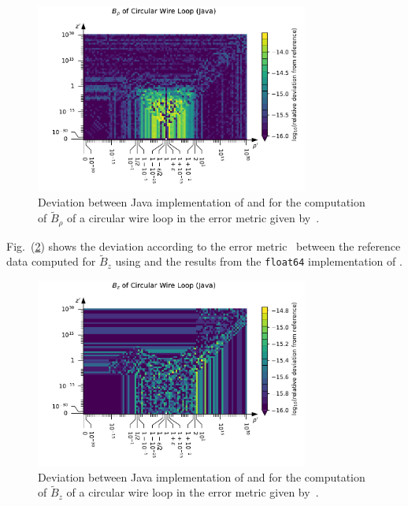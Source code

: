 \begin{figure}[htbp]
 \centering
 \includegraphics[width=0.8\textwidth]{img/CircularWireLoop_B_rho_Java.pdf}
 \caption{Deviation between Java implementation of  and 
          for the computation of $\tilde{B}_\rho$ of a circular wire loop
          in the error metric given by~.}
 \label{fig:CircularWireLoop_B_rho_Java}
\end{figure}
Fig.~(\ref{fig:CircularWireLoop_B_z_Java}) shows the deviation
according to the error metric~
between the reference data computed for $\tilde{B}_z$ using 
and the results from the \texttt{float64} implementation of .
\begin{figure}[htbp]
 \centering
 \includegraphics[width=0.8\textwidth]{img/CircularWireLoop_B_z_Java.pdf}
 \caption{Deviation between Java implementation of  and 
          for the computation of $\tilde{B}_z$ of a circular wire loop
          in the error metric given by~.}
 \label{fig:CircularWireLoop_B_z_Java}
\end{figure}

